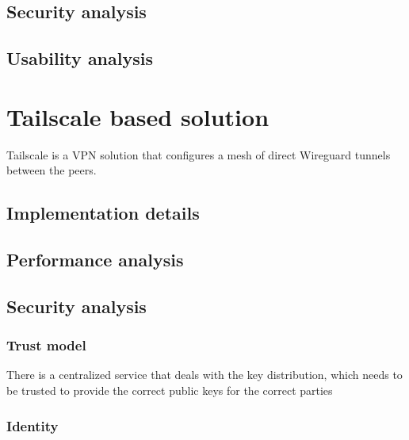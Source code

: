 \hypertarget{security-analysis}{%
\section{Security analysis}\label{security-analysis}}

\hypertarget{usability-analysis}{%
\section{Usability analysis}\label{usability-analysis}}

\hypertarget{tailscale-based-solution}{%
\chapter{Tailscale based solution}\label{tailscale-based-solution}}

Tailscale is a VPN solution that configures a mesh of direct Wireguard
tunnels between the peers.

\hypertarget{implementation-details}{%
\section{Implementation details}\label{implementation-details}}

\hypertarget{performance-analysis}{%
\section{Performance analysis}\label{performance-analysis}}

\hypertarget{security-analysis}{%
\section{Security analysis}\label{security-analysis}}

\hypertarget{trust-model}{%
\subsection{Trust model}\label{trust-model}}

There is a centralized service that deals with the key distribution,
which needs to be trusted to provide the correct public keys for the
correct parties

\hypertarget{identity}{%
\subsection{Identity}\label{identity}}

